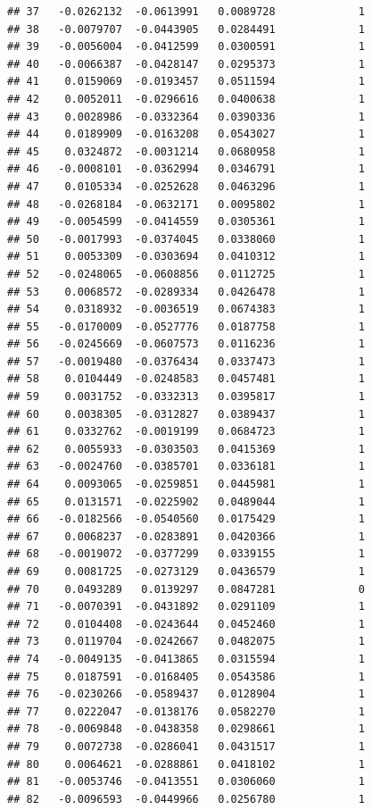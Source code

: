 \documentclass[12pt]{article}\usepackage[]{graphicx}\usepackage[]{xcolor}
\makeatletter
\newenvironment{kframe}{%
 \def\at@end@of@kframe{}%
 \ifinner\ifhmode%
  \def\at@end@of@kframe{\end{minipage}}%
  \begin{minipage}{\columnwidth}%
 \fi\fi%
 \def\FrameCommand##1{\hskip\@totalleftmargin \hskip-\fboxsep
 \colorbox{shadecolor}{##1}\hskip-\fboxsep
     \hskip-\linewidth \hskip-\@totalleftmargin \hskip\columnwidth}%
 \MakeFramed {\advance\hsize-\width
   \@totalleftmargin\z@ \linewidth\hsize
   \@setminipage}}%
 {\par\unskip\endMakeFramed%
 \at@end@of@kframe}
\newenvironment{knitrout}{}{} %
\makeatother
\begin{document}
\begin{knitrout}
\begin{kframe}
\begin{verbatim}
## 37   -0.0262132  -0.0613991   0.0089728             1
## 38   -0.0079707  -0.0443905   0.0284491             1
## 39   -0.0056004  -0.0412599   0.0300591             1
## 40   -0.0066387  -0.0428147   0.0295373             1
## 41    0.0159069  -0.0193457   0.0511594             1
## 42    0.0052011  -0.0296616   0.0400638             1
## 43    0.0028986  -0.0332364   0.0390336             1
## 44    0.0189909  -0.0163208   0.0543027             1
## 45    0.0324872  -0.0031214   0.0680958             1
## 46   -0.0008101  -0.0362994   0.0346791             1
## 47    0.0105334  -0.0252628   0.0463296             1
## 48   -0.0268184  -0.0632171   0.0095802             1
## 49   -0.0054599  -0.0414559   0.0305361             1
## 50   -0.0017993  -0.0374045   0.0338060             1
## 51    0.0053309  -0.0303694   0.0410312             1
## 52   -0.0248065  -0.0608856   0.0112725             1
## 53    0.0068572  -0.0289334   0.0426478             1
## 54    0.0318932  -0.0036519   0.0674383             1
## 55   -0.0170009  -0.0527776   0.0187758             1
## 56   -0.0245669  -0.0607573   0.0116236             1
## 57   -0.0019480  -0.0376434   0.0337473             1
## 58    0.0104449  -0.0248583   0.0457481             1
## 59    0.0031752  -0.0332313   0.0395817             1
## 60    0.0038305  -0.0312827   0.0389437             1
## 61    0.0332762  -0.0019199   0.0684723             1
## 62    0.0055933  -0.0303503   0.0415369             1
## 63   -0.0024760  -0.0385701   0.0336181             1
## 64    0.0093065  -0.0259851   0.0445981             1
## 65    0.0131571  -0.0225902   0.0489044             1
## 66   -0.0182566  -0.0540560   0.0175429             1
## 67    0.0068237  -0.0283891   0.0420366             1
## 68   -0.0019072  -0.0377299   0.0339155             1
## 69    0.0081725  -0.0273129   0.0436579             1
## 70    0.0493289   0.0139297   0.0847281             0
## 71   -0.0070391  -0.0431892   0.0291109             1
## 72    0.0104408  -0.0243644   0.0452460             1
## 73    0.0119704  -0.0242667   0.0482075             1
## 74   -0.0049135  -0.0413865   0.0315594             1
## 75    0.0187591  -0.0168405   0.0543586             1
## 76   -0.0230266  -0.0589437   0.0128904             1
## 77    0.0222047  -0.0138176   0.0582270             1
## 78   -0.0069848  -0.0438358   0.0298661             1
## 79    0.0072738  -0.0286041   0.0431517             1
## 80    0.0064621  -0.0288861   0.0418102             1
## 81   -0.0053746  -0.0413551   0.0306060             1
## 82   -0.0096593  -0.0449966   0.0256780             1

\end{verbatim}
\end{kframe}
\end{knitrout}
\end{document}
